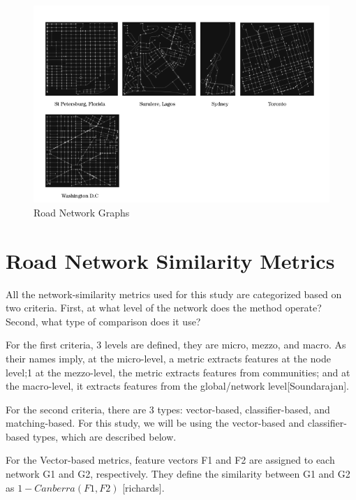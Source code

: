 \begin{figure}[h!]
\centering
\includegraphics[width=1.0\textwidth,center]{picture/Graphs2.png}
\caption[Road Network Graphs]{Road Network Graphs}
\label{fig:roadnetworkgraphs}
\end{figure}

\section{Road Network Similarity Metrics}
All the network-similarity metrics used for this study are categorized based on two criteria. First, at what level of the network does the method operate? Second, what type of comparison does it use? 

For the first criteria, 3 levels are defined, they are micro, mezzo, and macro. As their names imply, at the micro-level, a metric extracts features at the node level;1 at the mezzo-level, the metric extracts features from communities; and at the macro-level, it extracts features from the global/network level[Soundarajan].


For the second criteria, there are 3 types: vector-based, classifier-based, and matching-based. For this study, we will be using the vector-based and classifier-based types, which are described below. 

For the Vector-based metrics, feature vectors F1 and F2 are assigned to each network G1 and G2, respectively. They define the similarity between G1 and G2 as $1-Canberra(F1, F2)$ [richards].

